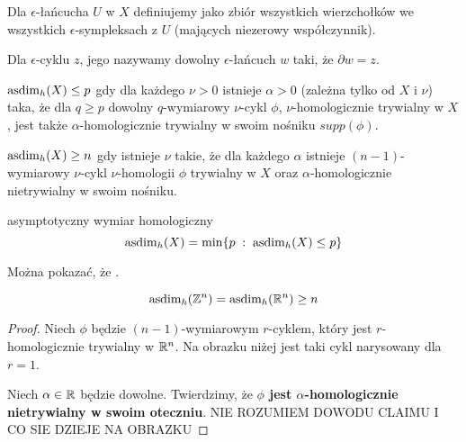 Dla $\epsilon$-łańcucha $U$ w $X$ definiujemy  jako zbiór wszystkich wierzchołków we wszystkich $\epsilon$-sympleksach z $U$ (mających niezerowy współczynnik).

Dla $\epsilon$-cyklu $z$, jego  nazywamy dowolny $\epsilon$-łańcuch $w$ taki, że $\partial w=z$.



  $\operatorname{asdim}_h(X)\leq p$ gdy dla każdego $\nu>0$ istnieje $\alpha>0$ (zależna tylko od $X$ i $\nu$) taka, że dla $q\geq p$ dowolny $q$-wymiarowy $\nu$-cykl $\phi$, $\nu$-homologicznie trywialny w $X$, jest także $\alpha$-homologicznie trywialny w swoim nośniku $supp(\phi)$.

  $\operatorname{asdim}_h(X)\geq n$ gdy istnieje $\nu$ takie, że dla każdego $\alpha$ istnieje $(n-1)$-wymiarowy $\nu$-cykl $\nu$-homologii $\phi$ trywialny w $X$ oraz $\alpha$-homologicznie nietrywialny w swoim nośniku.

\begin{definition}{asymptotyczny wymiar homologiczny}{}
  $$\operatorname{asdim}_h(X)=\min \{p\;:\;\operatorname{asdim}_h(X)\leq p\}$$
\end{definition}

Można pokazać, że .


\begin{lemma}{}{}
  $$\operatorname{asdim}_h(\mathbb{Z}^n)=\operatorname{asdim}_h(\mathbb{R}^n)\geq n$$
\end{lemma}

\begin{proof}
  Niech $\phi$ będzie $(n-1)$-wymiarowym $r$-cyklem, który jest $r$-homologicznie trywialny w $\mathbb{R}^n$. Na obrazku niżej jest taki cykl narysowany dla $r=1$.
  \begin{center}
  \end{center}

  Niech $\alpha\in\mathbb{R}$ będzie dowolne. Twierdzimy, że \textbf{$\phi$ jest $\alpha$-homologicznie nietrywialny w swoim oteczniu}.
  {\large\color{red}NIE ROZUMIEM DOWODU CLAIMU I CO SIE DZIEJE NA OBRAZKU}
\end{proof}

